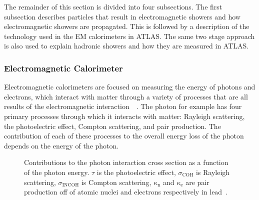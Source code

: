 The remainder of this section is divided into four subsections.  
The first subsection describes particles that result in electromagnetic showers and how electromagnetic showers are propagated.  
This is followed by a description of the technology used in the EM calorimeters in ATLAS.  
The same two stage approach is also used to explain hadronic showers and how they are measured in ATLAS.  

\subsubsection{Electromagnetic Calorimeter}
\label{EMCalo} 

Electromagnetic calorimeters are focused on measuring the energy of photons and electrons, which interact with matter through a variety of processes that are all results of the electromagnetic interaction~\cite{grupen2008particle}~\cite{Wigmans2008}.  
The photon for example has four primary processes through which it interacts with matter: Rayleigh scattering, the photoelectric effect, Compton scattering, and pair production.  
The contribution of each of these processes to the overall energy loss of the photon depends on the energy of the photon.  

\begin{figure}[!ht]
    \begin{center}
    \end{center}
        \caption[Contributions to the photon interaction cross section]
        {\small Contributions to the photon interaction cross section as a function of the photon energy.  $\tau$ is the photoelectric effect, $\sigma_{\mathrm{COH}}$ is Rayleigh scattering, $\sigma_{\mathrm{INCOH}}$ is Compton scattering, $\kappa_{\mathrm n}$ and $\kappa_{\mathrm e}$ are pair production off of atomic nuclei and electrons respectively in lead~\cite{:/content/aip/journal/jpcrd/9/4/10.1063/1.555629}. 
}
            \label{Photon}
\end{figure}

